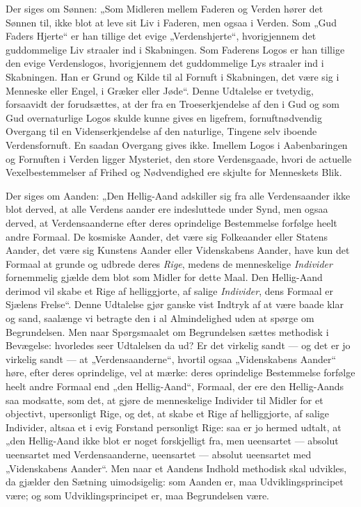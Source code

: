 \documentclass[12pt]{book}
\begin{document}
Der siges om Sønnen: „Som Midleren mellem Faderen og Verden hører
det Sønnen til, ikke blot at leve sit Liv i Faderen, men ogsaa i
Verden. Som „Gud Faders Hjerte“ er han tillige det evige
„Verdenshjerte“, hvorigjennem det guddommelige Liv straaler ind i
Skabningen. Som Faderens Logos er han tillige den evige
Verdenslogos, hvorigjennem det guddommelige Lys straaler ind i
Skabningen. Han er Grund og Kilde til al Fornuft i Skabningen, det
være sig i Menneske eller Engel, i Græker eller Jøde“. Denne
Udtalelse er tvetydig, forsaavidt der forudsættes, at der fra en
Troeserkjendelse af den i Gud og som Gud overnaturlige Logos skulde
kunne gives en ligefrem, fornuftnødvendig Overgang til en
Videnserkjendelse af den naturlige, Tingene selv iboende
Verdensfornuft. En saadan Overgang gives ikke. Imellem Logos i
Aabenbaringen og Fornuften i Verden ligger Mysteriet, den store
Verdensgaade, hvori de actuelle Vexelbestemmelser af Frihed og
Nødvendighed ere skjulte for Menneskets Blik.

Der siges om Aanden: „Den Hellig-Aand adskiller sig fra alle
Verdensaander ikke blot derved, at alle Verdens\-
aander ere indesluttede under Synd, men ogsaa derved, at
Verdensaanderne efter deres oprindelige Bestemmelse forfølge heelt
andre Formaal. De kosmiske Aander, det være sig Folkeaander eller
Statens Aander, det være sig Kunstens Aander eller Videnskabens
Aander, have kun det Formaal at grunde og udbrede deres
\emph{Rige}, medens de menneskelige \emph{Individer} fornemmelig
gjælde dem blot som Midler for dette Maal. Den Hellig-Aand derimod
vil skabe et Rige af helliggjorte, af salige \emph{Individer}, dens
Formaal er Sjælens Frelse“. Denne Udtalelse gjør ganske vist
Indtryk af at være baade klar og sand, saalænge vi betragte den i al
Almindelighed uden at spørge om Begrundelsen. Men naar Spørgsmaalet
om Begrundelsen sættes methodisk i Bevægelse: hvorledes seer
Udtalelsen da ud? Er det virkelig sandt --- og det er jo virkelig
sandt --- at „Verdensaanderne“, hvortil ogsaa „Videnskabens Aander“
høre, efter deres oprindelige, vel at mærke: deres oprindelige
Bestemmelse forfølge heelt andre Formaal end „den Hellig-Aand“,
Formaal, der ere den Hellig-Aands saa modsatte, som det, at gjøre de
menneskelige Individer til Midler for et objectivt, upersonligt
Rige, og det, at skabe et Rige af helliggjorte, af salige
Individer, altsaa et i evig Forstand personligt Rige: saa er jo
hermed udtalt, at „den Hellig-Aand ikke blot er noget forskjelligt
fra, men ueensartet --- absolut ueensartet med Verdensaanderne,
ueensartet --- absolut ueensartet med „Videnskabens Aander“. Men
naar et Aandens Indhold methodisk skal udvikles, da gjælder den
Sætning uimodsigelig: som Aanden er, maa Udviklingsprincipet være;
og som Udviklingsprincipet er, maa Begrundelsen være.
\end{document}
